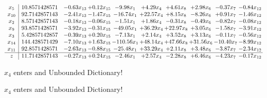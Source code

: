 \documentclass[9pt]{article}
\begin{document}
 \[\begin{array}{c| c c@{\hskip 2pt} c@{\hskip 2pt} c@{\hskip 2pt} c@{\hskip 2pt} c@{\hskip 2pt} c@{\hskip 2pt} c@{\hskip 2pt} c@{\hskip 2pt} }
 x_{5}   &  10.8571428571 & -0.63 x_{13} & +  0.12 x_{15} & -9.98 x_{1} & +  4.29 x_{4} & +  4.61 x_{8} & +  2.98 x_{6} & -0.37 x_{7} & -0.84 x_{12}\\
 x_{10}   &  92.7142857143 & -2.41 x_{13} & -1.47 x_{15} & -16.74 x_{1} & + 22.57 x_{4} & +  8.15 x_{8} & -8.26 x_{6} & +  0.91 x_{7} & -1.46 x_{12}\\
 x_{2}   &  8.57142857143 & -0.18 x_{13} & -0.06 x_{15} & -1.51 x_{1} & +  1.86 x_{4} & -0.31 x_{8} & -0.49 x_{6} & -0.82 x_{7} & -0.08 x_{12}\\
 x_{9}   &  93.8571428571 & -3.92 x_{13} & -0.31 x_{15} & -49.05 x_{1} & + 36.29 x_{4} & + 22.97 x_{8} & +  3.05 x_{6} & -1.58 x_{7} & -3.91 x_{12}\\
 x_{3}   &  5.42857142857 & -0.39 x_{13} & +  0.20 x_{15} & -7.13 x_{1} & +  2.14 x_{4} & +  3.52 x_{8} & +  3.13 x_{6} & -0.11 x_{7} & -0.56 x_{12}\\
 x_{14}   &  144.428571429 & -7.10 x_{13} & +  1.63 x_{15} & -110.56 x_{1} & + 48.14 x_{4} & + 47.66 x_{8} & + 31.56 x_{6} & -10.40 x_{7} & -8.99 x_{12}\\
 x_{11}   &  92.8571428571 & -2.63 x_{13} & -0.88 x_{15} & -25.48 x_{1} & + 33.29 x_{4} & +  2.11 x_{8} & +  3.48 x_{6} & -3.87 x_{7} & -2.34 x_{12}\\
\hline
z    &  11.7142857143 & -0.27 x_{13} & +  0.24 x_{15} & -2.46 x_{1} & +  2.57 x_{4} & -2.28 x_{8} & +  6.46 x_{6} & -4.23 x_{7} & -0.17 x_{12}\\
\end{array}\]


 $ x_{4} $ enters and Unbounded Dictionary!


 $ x_{4} $ enters and Unbounded Dictionary!
\end{document}
